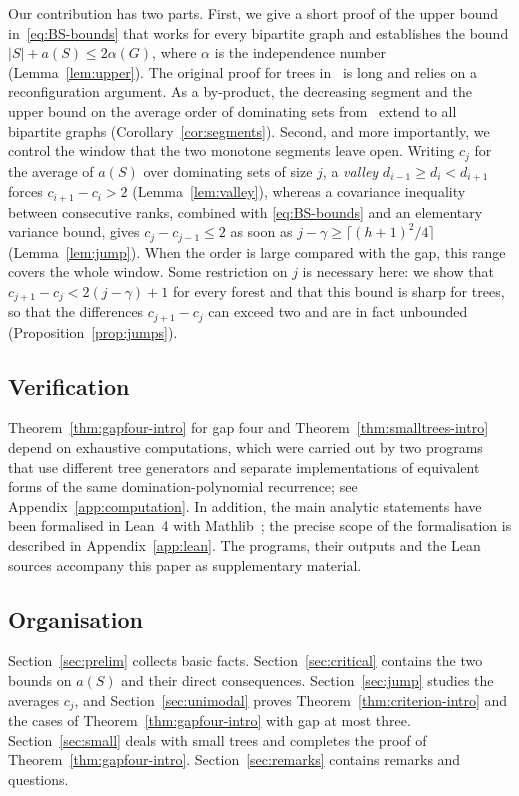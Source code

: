 \documentclass[smallextended,envcountsect,envcountsame]{svjour3}
\begin{document}
Our contribution has two parts. First, we give a short proof of the upper
bound in~\eqref{eq:BS-bounds} that works for every bipartite graph and
establishes the bound $|S|+a(S)\le 2\alpha(G)$, where $\alpha$ is the
independence number (Lemma~\ref{lem:upper}). The original proof for trees
in~\cite{BS} is long and relies on a reconfiguration argument. As a
by-product, the decreasing segment and the upper bound on the average order
of dominating sets from~\cite{BS} extend to all bipartite graphs
(Corollary~\ref{cor:segments}). Second, and more importantly, we control the
window that the two monotone segments leave open. Writing $c_j$ for the
average of $a(S)$ over dominating sets of size $j$, a \emph{valley}
$d_{i-1}\ge d_i<d_{i+1}$ forces $c_{i+1}-c_i>2$ (Lemma~\ref{lem:valley}),
whereas a covariance inequality between consecutive ranks, combined with
\eqref{eq:BS-bounds} and an elementary variance bound, gives
$c_{j}-c_{j-1}\le 2$ as soon as $j-\gamma\ge\lceil (h+1)^2/4\rceil$
(Lemma~\ref{lem:jump}). When the order is large compared with the gap, this
range covers the whole window. Some restriction on $j$ is necessary here: we
show that $c_{j+1}-c_j<2(j-\gamma)+1$ for every forest and that this bound is
sharp for trees, so that the differences $c_{j+1}-c_j$ can exceed two and are
in fact unbounded (Proposition~\ref{prop:jumps}).

\subsection*{Verification}
Theorem~\ref{thm:gapfour-intro} for gap four and
Theorem~\ref{thm:smalltrees-intro} depend on exhaustive computations, which
were carried out by two programs that use different tree generators and separate implementations of equivalent
forms of the same domination-polynomial recurrence; see
Appendix~\ref{app:computation}. In addition, the main analytic statements
have been formalised in Lean~4 with Mathlib~\cite{Lean,Mathlib}; the precise
scope of the formalisation is described in Appendix~\ref{app:lean}. The
programs, their outputs and the Lean sources accompany this paper as
supplementary material.

\subsection*{Organisation}
Section~\ref{sec:prelim} collects basic facts. Section~\ref{sec:critical}
contains the two bounds on $a(S)$ and their direct consequences.
Section~\ref{sec:jump} studies the averages $c_j$, and
Section~\ref{sec:unimodal} proves Theorem~\ref{thm:criterion-intro} and the
cases of Theorem~\ref{thm:gapfour-intro} with gap at most three.
Section~\ref{sec:small} deals with small trees and completes the proof of
Theorem~\ref{thm:gapfour-intro}. Section~\ref{sec:remarks} contains remarks
and questions.
\end{document}
